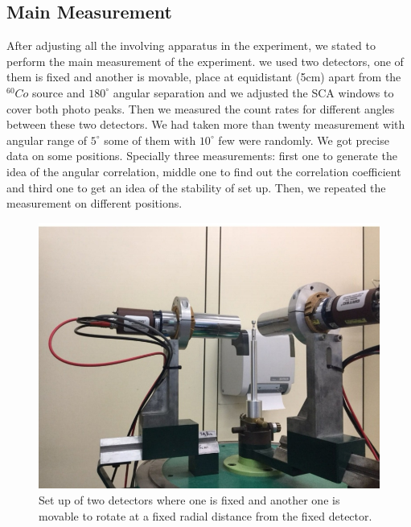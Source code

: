 \newpage
\subsection{Main Measurement}
After adjusting all the involving apparatus in the experiment, we stated to perform the main measurement of the experiment. we used two detectors, one of them is fixed and another is movable, place at equidistant (5cm) apart from the $ ^{60}Co$ source and  $180^{\circ} $ angular separation and we adjusted the SCA windows to cover both photo peaks. Then we measured the count rates for different angles between these two detectors. We had taken more than twenty measurement with angular range of $5^{\circ}$ some of them with $10^{\circ}$ few were randomly. We got precise data on some positions. Specially three measurements: first one to generate the idea of the angular correlation, middle one to find out the correlation coefficient and third one to get an idea of the stability of set up. Then, we repeated the measurement on different positions.

\begin{figure}[ht]
	\centering
	\includegraphics[width=0.8\linewidth]{./figs/detectors.jpg}
	\caption{Set up of two detectors where one is fixed and another one is movable to rotate at a fixed radial distance from the fixed detector.}%
	\label{fig:detect}
\end{figure}



